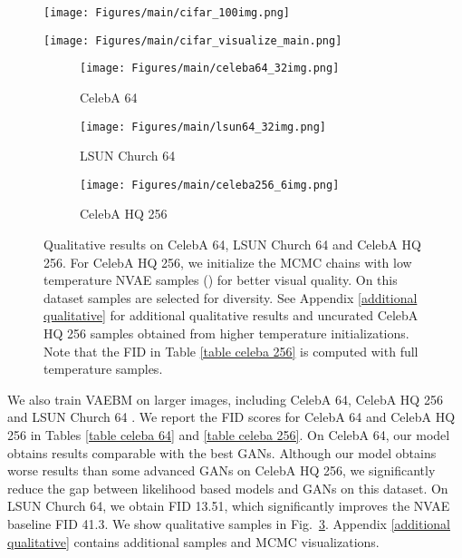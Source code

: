 \documentclass{article} \usepackage{iclr2021_conference,times}
\begin{document}
\begin{figure*}[ht]
    \centering
    \begin{subfigure}{.48\linewidth}
    \texttt{[image: Figures/main/cifar\_100img.png]}
    \caption{}\label{cifar fig main}
    \end{subfigure}
    \begin{subfigure}{.36\linewidth}
    \texttt{[image: Figures/main/cifar\_visualize\_main.png]}
    \caption{}\label{MCMC visualizaton}
    \end{subfigure}
\caption{
(a) CIFAR-10 samples generated by VAEBM. (b) Visualizing MCMC sampling chains. Samples are generated by running 16 LD steps. Chains are initialized with pre-trained VAE. We show intermediate samples at every 2 steps. See Appendix \ref{additional qualitative} for additional qualitative results.}\label{fig main sample}
\end{figure*}

\begin{figure}[h]
    \centering
    \begin{subfigure}{.48\linewidth}
    \texttt{[image: Figures/main/celeba64\_32img.png]}
    \caption{CelebA 64}
    \end{subfigure}
    \begin{subfigure}{.48\linewidth}
    \texttt{[image: Figures/main/lsun64\_32img.png]}
    \caption{LSUN Church 64}
    \end{subfigure}
    \begin{subfigure}{.98\linewidth}
    \texttt{[image: Figures/main/celeba256\_6img.png]}
    \caption{CelebA HQ 256}\end{subfigure}
    
\caption{Qualitative results on CelebA 64, LSUN Church 64 and CelebA HQ 256. For CelebA HQ 256, we initialize the MCMC chains with low temperature NVAE samples () for better visual quality. On this dataset samples are selected for diversity. See Appendix \ref{additional qualitative} for additional qualitative results and uncurated CelebA HQ 256 samples obtained from higher temperature initializations. Note that the FID in Table \ref{table celeba 256} is computed with full temperature samples.}\label{fig larger dataset}
\end{figure}

We also train VAEBM on larger images, including CelebA 64, CelebA HQ 256 \citep{liu2015deep} and LSUN Church 64 \citep{yu2015lsun}. We report the FID scores for CelebA 64 and CelebA HQ 256 in Tables \ref{table celeba 64} and \ref{table celeba 256}. On CelebA 64, our model obtains results comparable with the best GANs. Although our model obtains worse results than some advanced GANs on CelebA HQ 256, we significantly reduce the gap between likelihood based models and GANs on this dataset. On LSUN Church 64, we obtain FID 13.51, which significantly improves the NVAE baseline FID 41.3. We show qualitative samples in Fig.~\ref{fig larger dataset}. Appendix \ref{additional qualitative} contains additional samples and MCMC visualizations. 
\end{document}
